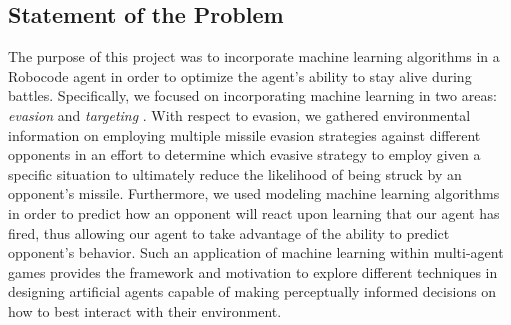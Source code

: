\documentclass{article}
\theoremstyle{plain}
\theoremstyle{definition}
\theoremstyle{remark}
\begin{document}
\subsection*{Statement of the Problem}

The purpose of this project was to incorporate machine learning algorithms in a Robocode agent in order to optimize the agent's ability to stay alive during battles. Specifically, we focused on incorporating machine learning in two areas: \emph{evasion} and \emph{targeting} . With respect to evasion, we gathered environmental information on employing multiple missile evasion strategies against different opponents in an effort to determine which evasive strategy to employ given a specific situation to ultimately reduce the likelihood of being struck by an opponent's missile.  Furthermore, we used modeling machine learning algorithms in order to predict how an opponent will react upon learning that our agent has fired, thus allowing our agent to take advantage of the ability to predict opponent's behavior. Such an application of machine learning within multi-agent games provides the framework and motivation to explore different techniques in designing artificial agents capable of making perceptually informed decisions on how to best interact with their environment. 
\end{document}

